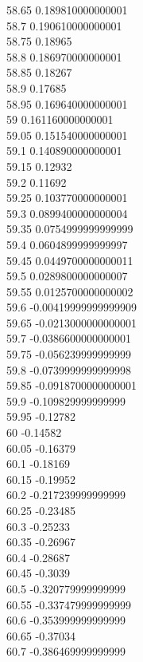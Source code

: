 {58.65	0.189810000000001\\
58.7	0.190610000000001\\
58.75	0.18965\\
58.8	0.186970000000001\\
58.85	0.18267\\
58.9	0.17685\\
58.95	0.169640000000001\\
59	0.161160000000001\\
59.05	0.151540000000001\\
59.1	0.140890000000001\\
59.15	0.12932\\
59.2	0.11692\\
59.25	0.103770000000001\\
59.3	0.0899400000000004\\
59.35	0.0754999999999999\\
59.4	0.0604899999999997\\
59.45	0.0449700000000011\\
59.5	0.0289800000000007\\
59.55	0.0125700000000002\\
59.6	-0.00419999999999909\\
59.65	-0.0213000000000001\\
59.7	-0.0386600000000001\\
59.75	-0.056239999999999\\
59.8	-0.0739999999999998\\
59.85	-0.0918700000000001\\
59.9	-0.109829999999999\\
59.95	-0.12782\\
60	-0.14582\\
60.05	-0.16379\\
60.1	-0.18169\\
60.15	-0.19952\\
60.2	-0.217239999999999\\
60.25	-0.23485\\
60.3	-0.25233\\
60.35	-0.26967\\
60.4	-0.28687\\
60.45	-0.3039\\
60.5	-0.320779999999999\\
60.55	-0.337479999999999\\
60.6	-0.353999999999999\\
60.65	-0.37034\\
60.7	-0.386469999999999\\
}
